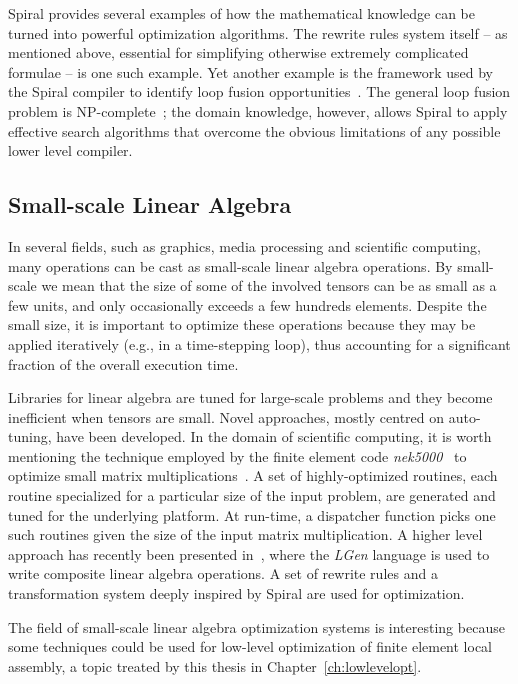 Spiral provides several examples of how the mathematical knowledge can be turned into powerful optimization algorithms. The rewrite rules system itself -- as mentioned above, essential for simplifying otherwise extremely complicated formulae -- is one such example. Yet another example is the framework used by the Spiral compiler to identify loop fusion opportunities~\cite{spiral-fusion}. The general loop fusion problem is NP-complete~\cite{fusion-complexity}; the domain knowledge, however, allows Spiral to apply effective search algorithms that overcome the obvious limitations of any possible lower level compiler.


\subsection{Small-scale Linear Algebra}
In several fields, such as graphics, media processing and scientific computing, many operations can be cast as small-scale linear algebra operations. By small-scale we mean that the size of some of the involved tensors can be as small as a few units, and only occasionally exceeds a few hundreds elements. Despite the small size, it is important to optimize these operations because they may be applied iteratively (e.g., in a time-stepping loop), thus accounting for a significant fraction of the overall execution time. 

Libraries for linear algebra are tuned for large-scale problems and they become inefficient when tensors are small. Novel approaches, mostly centred on auto-tuning, have been developed. In the domain of scientific computing, it is worth mentioning the technique employed by the finite element code {\em nek5000}~\citep{nek5000-web-page} to optimize small matrix multiplications~\citep{nek5000}. A set of highly-optimized routines, each routine specialized for a particular size of the input problem, are generated and tuned for the underlying platform. At run-time, a dispatcher function picks one such routines given the size of the input matrix multiplication. A higher level approach has recently been presented in~\cite{Spampinato:14}, where the {\em LGen} language is used to write composite linear algebra operations. A set of rewrite rules and a transformation system deeply inspired by Spiral are used for optimization.

The field of small-scale linear algebra optimization systems is interesting because some techniques could be used for low-level optimization of finite element local assembly, a topic treated by this thesis in Chapter~\ref{ch:lowlevelopt}.


